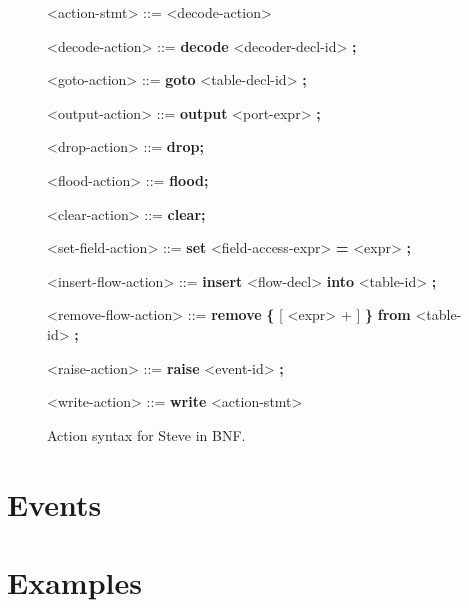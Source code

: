 \begin{figure}
\begin{mdframed}
\begin{grammar}
<action-stmt> ::=
<decode-action>

<decode-action> ::=
\textbf{decode} <decoder-decl-id> \textbf{;}

<goto-action> ::=
\textbf{goto} <table-decl-id> \textbf{;}

<output-action> ::=
\textbf{output} <port-expr> \textbf{;}

<drop-action> ::= \textbf{drop;}

<flood-action> ::= \textbf{flood;}

<clear-action> ::= \textbf{clear;}

<set-field-action> ::= \textbf{set} <field-access-expr> \textbf{=} <expr> \textbf{;}

<insert-flow-action> ::= \textbf{insert} <flow-decl> \textbf{into} <table-id> \textbf{;}

<remove-flow-action> ::= \textbf{remove} \textbf{\{} [ <expr> + ] \textbf{\}}
\textbf{from} <table-id> \textbf{;}

<raise-action> ::= \textbf{raise} <event-id> \textbf{;}

<write-action> ::= \textbf{write} <action-stmt>

\end{grammar}
\end{mdframed}
\caption{Action syntax for Steve in BNF.}
\label{fg:action_syntax}
\end{figure}

\section{Events} \label{event_tut}

\section{Examples} \label{examples_tut}